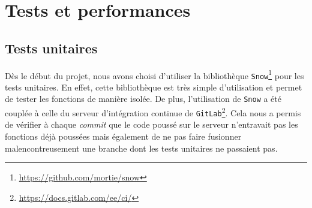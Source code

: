 \documentclass[a4paper, 12pt]{report}
\begin{document}
\section{Tests et performances}
\subsection{Tests unitaires}
Dès le début du projet, nous avons choisi d'utiliser la bibliothèque \texttt{Snow}\footnote{\url{https://github.com/mortie/snow}} pour les tests unitaires. En effet, cette bibliothèque est très simple d'utilisation et permet de tester les fonctions de  manière isolée. De plus, l'utilisation de \texttt{Snow} a été couplée à celle du serveur d'intégration continue de \texttt{GitLab}\footnote{\url{https://docs.gitlab.com/ee/ci/}}. Cela nous a permis de vérifier à chaque \textit{commit} que le code poussé sur le serveur n'entravait pas les fonctions déjà poussées mais également de ne pas faire fusionner malencontreusement une branche dont les tests unitaires ne passaient pas.\par\bigskip
\end{document}
